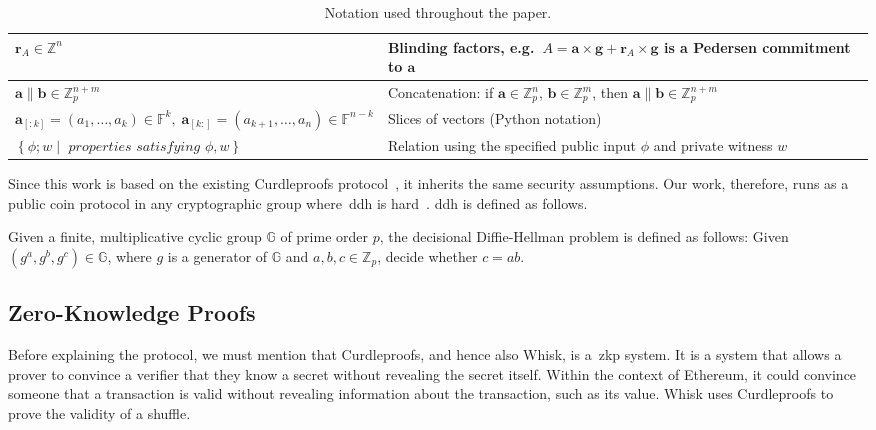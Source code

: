 \begin{table*}[!htb]
\begin{tabular}{|l|l|}
        \hline
        $\mathbf{r}_A\in\mathbb{Z}^n$ & Blinding factors, e.g.\ $A=\mathbf{a}\times\mathbf{g} + \mathbf{r}_A \times \mathbf{g}$ is a Pedersen commitment to $\mathbf{a}$ \\
        \hline
        $\mathbf{a}\parallel \mathbf{b}\in\mathbb{Z}_p^{n+m}$
        & Concatenation: if $\mathbf{a}\in\mathbb{Z}_p^n$, $\mathbf{b}\in\mathbb{Z}_p^m$, then $\mathbf{a}\parallel \mathbf{b}\in\mathbb{Z}_p^{n+m}$ \\
        \hline
        $\mathbf{a}_{[:k]}=(a_1,\dots,a_k)\in\mathbb{F}^k, \; \mathbf{a}_{[k:]}=(a_{k+1},\dots,a_n)\in\mathbb{F}^{n-k}$
        & Slices of vectors (Python notation) \\
        \hline
        $\left\{\phi; w\middle|\textit{ properties satisfying }\phi,w\right\}$
        & Relation using the specified public input $\phi$ and private witness $w$ \\
        \hline
    \end{tabular}
    \caption{Notation used throughout the paper.}
    \label{tab:notation}
\end{table*}


Since this work is based on the existing Curdleproofs protocol~\cite{Curdleproofs}, it inherits the same security assumptions.
Our work, therefore, runs as a public coin protocol in any cryptographic group where~\gls{ddh} is hard~\cite{10.1007/BFb0054851}.
\gls{ddh} is defined as follows.

\begin{definition}[DDH]
 Given a finite, multiplicative cyclic group $\mathbb{G}$ of prime order $p$, the decisional Diffie-Hellman problem is defined as follows: Given $(g^a,g^b,g^c)\in\mathbb{G}$, where $g$ is a generator of $\mathbb{G}$ and $a,b,c\in\mathbb{Z}_p$, decide whether $c=ab$.
\end{definition}

\subsection{Zero-Knowledge Proofs}\label{sec:background-zkps}
Before explaining the protocol, we must mention that Curdleproofs, and hence also Whisk, is a~\gls{zkp} system.
It is a system that allows a prover to convince a verifier that they know a secret without revealing the secret itself.
Within the context of Ethereum, it could convince someone that a transaction is valid without revealing information about the transaction, such as its value.
Whisk uses Curdleproofs to prove the validity of a shuffle.

